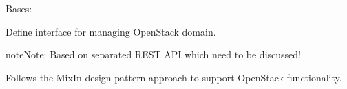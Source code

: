 \documentclass[letterpaper,10pt,english]{sphinxmanual}
\begin{document}

\begin{fulllineitems}
\label{util/adapter:escape.util.adapter.OpenStackAPI}
Bases: \href{https://docs.python.org/2.7/library/functions.html\#object}{}

Define interface for managing OpenStack domain.

\begin{notice}{note}{Note:}
Based on separated REST API which need to be discussed!
\end{notice}

Follows the MixIn design pattern approach to support OpenStack functionality.

\end{fulllineitems}

\end{document}
